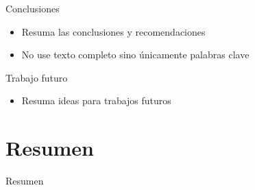 \documentclass[15pt]{beamer} %
\begin{document}
\begin{frame}{Conclusiones}
  
  \begin{itemize}
  \item Resuma las conclusiones y recomendaciones
  \item No use texto completo sino únicamente palabras clave
  \end{itemize}
  
\end{frame}

\begin{frame}{Trabajo futuro}
  
  \begin{itemize}
  \item Resuma ideas para trabajos futuros
  \end{itemize}
  
\end{frame}


\section{Resumen}

\begin{frame}{Resumen}
  \tableofcontents
\end{frame}
\end{document}
